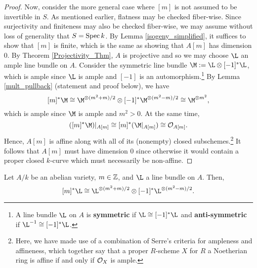 \documentclass[11pt]{article}
\begin{document}
\begin{proof}
Now, consider the more general case where $[m]$ is not assumed to be invertible in $S$. As mentioned earlier, flatness may be checked fiber-wise. Since surjectivity and finiteness may also be checked fiber-wise, we may assume without loss of generality that $S=\operatorname{Spec} k$. By Lemma \ref{isogeny_simplified}, it suffices to show that $[m]$ is finite, which is the same as showing that $A[m]$ has dimension $0$. By Theorem \ref{Projectivity_Thm}, $A$ is projective and so we may choose $\L$ an ample line bundle on $A$. Consider the symmetric line bundle $\M:=\L\tensor[-1]^*\L$, which is ample since $\L$ is ample and $[-1]$ is an automorphism.\footnote{A line bundle $\L$ on $A$ is \textbf{symmetric} if $\L\iso[-1]^*\L$ and \textbf{anti-symmetric} if $\L^{-1}\iso[-1]^*\L$.} By Lemma \ref{mult_pullback} (statement and proof below), we have
$$[m]^*\M\iso\M^{\tensor(m^2+m)/2}\tensor[-1]^*\M^{\tensor(m^2-m)/2}\iso\M^{\tensor m^2},$$
which is ample since $\M$ is ample and $m^2>0$. At the same time,
\begin{equation*}
([m]^*\M)|_{A[m]}\iso[m]^*(\M|_{A[m]})\iso\O_{A[m]}.
\end{equation*}
Hence, $A[m]$ is affine along with all of its (nonempty) closed subschemes.\footnote{Here, we have made use of a combination of Serre's criteria for ampleness and affineness, which together say that a proper $R$-scheme $X$ for $R$ a Noetherian ring is affine if and only if $\mathcal{O}_X$ is ample.} It follows that $A[m]$ must have dimension $0$ since otherwise it would contain a proper closed $k$-curve which must necessarily be non-affine.
\end{proof}

\begin{lemma}\label{mult_pullback}
Let $A/k$ be an abelian variety, $m\in\mathbb{Z}$, and $\L$ a line bundle on $A$. Then,
$$[m]^*\L\iso\L^{\tensor(m^2+m)/2}\tensor[-1]^*\L^{\tensor(m^2-m)/2}.$$
\end{lemma}
\end{document}
